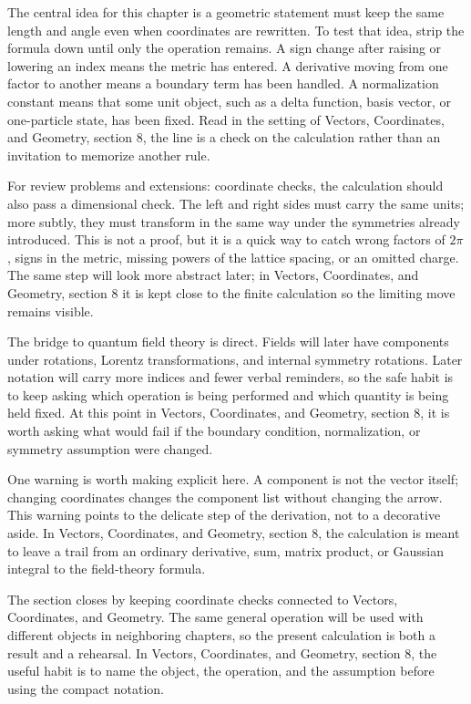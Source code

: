 The central idea for this chapter is a geometric statement must keep the same length and angle even when coordinates are rewritten.  To test that idea, strip the formula down until only the operation remains.  A sign change after raising or lowering an index means the metric has entered.  A derivative moving from one factor to another means a boundary term has been handled.  A normalization constant means that some unit object, such as a delta function, basis vector, or one-particle state, has been fixed.  Read in the setting of Vectors, Coordinates, and Geometry, section 8, the line is a check on the calculation rather than an invitation to memorize another rule.

For review problems and extensions: coordinate checks, the calculation should also pass a dimensional check.  The left and right sides must carry the same units; more subtly, they must transform in the same way under the symmetries already introduced.  This is not a proof, but it is a quick way to catch wrong factors of \(2\pi\), signs in the metric, missing powers of the lattice spacing, or an omitted charge.  The same step will look more abstract later; in Vectors, Coordinates, and Geometry, section 8 it is kept close to the finite calculation so the limiting move remains visible.

The bridge to quantum field theory is direct.  Fields will later have components under rotations, Lorentz transformations, and internal symmetry rotations.  Later notation will carry more indices and fewer verbal reminders, so the safe habit is to keep asking which operation is being performed and which quantity is being held fixed.  At this point in Vectors, Coordinates, and Geometry, section 8, it is worth asking what would fail if the boundary condition, normalization, or symmetry assumption were changed.

One warning is worth making explicit here.  A component is not the vector itself; changing coordinates changes the component list without changing the arrow.  This warning points to the delicate step of the derivation, not to a decorative aside.  In Vectors, Coordinates, and Geometry, section 8, the calculation is meant to leave a trail from an ordinary derivative, sum, matrix product, or Gaussian integral to the field-theory formula.

The section closes by keeping coordinate checks connected to Vectors, Coordinates, and Geometry.  The same general operation will be used with different objects in neighboring chapters, so the present calculation is both a result and a rehearsal.  In Vectors, Coordinates, and Geometry, section 8, the useful habit is to name the object, the operation, and the assumption before using the compact notation.



